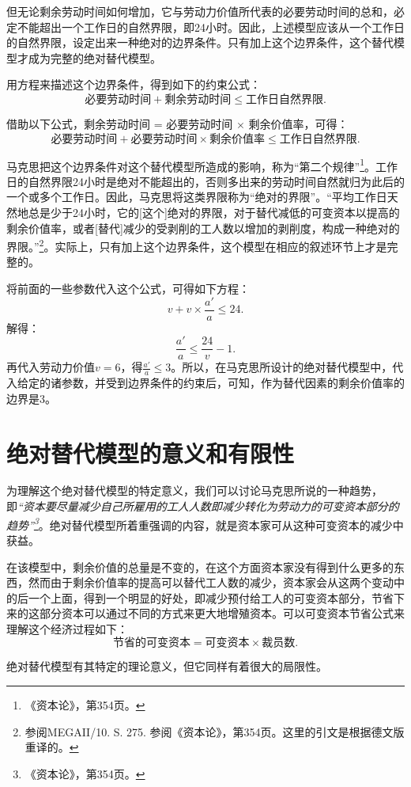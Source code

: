 \documentclass[a4paper,11pt]{ctexart}
\begin{document}
但无论剩余劳动时间如何增加，它与劳动力价值所代表的必要劳动时间的总和，必定不能超出一个工作日的自然界限，即24小时。因此，上述模型应该从一个工作日的自然界限，设定出来一种绝对的边界条件。只有加上这个边界条件，这个替代模型才成为完整的绝对替代模型。

用方程来描述这个边界条件，得到如下的约束公式：$$\mbox{必要劳动时间} + \mbox{剩余劳动时间} \le \mbox{工作日自然界限}.$$

借助以下公式，剩余劳动时间 = 必要劳动时间 $\times$ 剩余价值率，可得：$$\mbox{必要劳动时间} + \mbox{必要劳动时间} \times \mbox{剩余价值率} \le \mbox{工作日自然界限}.$$

马克思把这个边界条件对这个替代模型所造成的影响，称为“第二个规律”\footnote{《资本论》，第354页。}。工作日的自然界限24小时是绝对不能超出的，否则多出来的劳动时间自然就归为此后的一个或多个工作日。因此，马克思将这类界限称为“绝对的界限”。“平均工作日天然地总是少于24小时，它的[这个]绝对的界限，对于替代减低的可变资本以提高的剩余价值率，或者[替代]减少的受剥削的工人数以增加的剥削度，构成一种绝对的界限。”\footnote{参阅MEGAII/10. S. 275. 参阅《资本论》，第354页。这里的引文是根据德文版重译的。}。实际上，只有加上这个边界条件，这个模型在相应的叙述环节上才是完整的。

将前面的一些参数代入这个公式，可得如下方程：$$v + v \times \frac{a'}{a} \le 24.$$解得：$$\frac{a'}{a} \le \frac{24}{v} - 1.$$再代入劳动力价值$v = 6$，得$\frac{a'}{a} \le 3$。所以，在马克思所设计的绝对替代模型中，代入给定的诸参数，并受到边界条件的约束后，可知，作为替代因素的剩余价值率的边界是3。

\section{绝对替代模型的意义和有限性}

为理解这个绝对替代模型的特定意义，我们可以讨论马克思所说的一种趋势，即\textit{“资本要尽量减少自己所雇用的工人人数即减少转化为劳动力的可变资本部分的趋势”\footnote{《资本论》，第354页。}}。绝对替代模型所着重强调的内容，就是资本家可从这种可变资本的减少中获益。

在该模型中，剩余价值的总量是不变的，在这个方面资本家没有得到什么更多的东西，然而由于剩余价值率的提高可以替代工人数的减少，资本家会从这两个变动中的后一个上面，得到一个明显的好处，即减少预付给工人的可变资本部分，节省下来的这部分资本可以通过不同的方式来更大地增殖资本。可以可变资本节省公式来理解这个经济过程如下：$$\mbox{节省的可变资本} = \mbox{可变资本} \times \mbox{裁员数}.$$

绝对替代模型有其特定的理论意义，但它同样有着很大的局限性。
\end{document}
